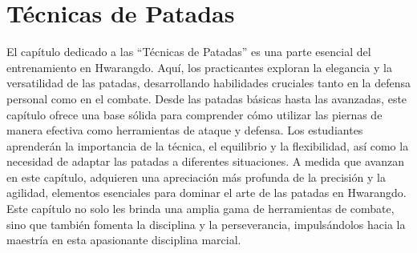 \chapter{Técnicas de Patadas}

El capítulo dedicado a las ``Técnicas de Patadas'' es una parte esencial del entrenamiento en Hwarangdo\textregistered. Aquí, los practicantes exploran la elegancia y la versatilidad de las patadas, desarrollando habilidades cruciales tanto en la defensa personal como en el combate. Desde las patadas básicas hasta las avanzadas, este capítulo ofrece una base sólida para comprender cómo utilizar las piernas de manera efectiva como herramientas de ataque y defensa. Los estudiantes aprenderán la importancia de la técnica, el equilibrio y la flexibilidad, así como la necesidad de adaptar las patadas a diferentes situaciones. A medida que avanzan en este capítulo, adquieren una apreciación más profunda de la precisión y la agilidad, elementos esenciales para dominar el arte de las patadas en Hwarangdo\textregistered. Este capítulo no solo les brinda una amplia gama de herramientas de combate, sino que también fomenta la disciplina y la perseverancia, impulsándolos hacia la maestría en esta apasionante disciplina marcial.

